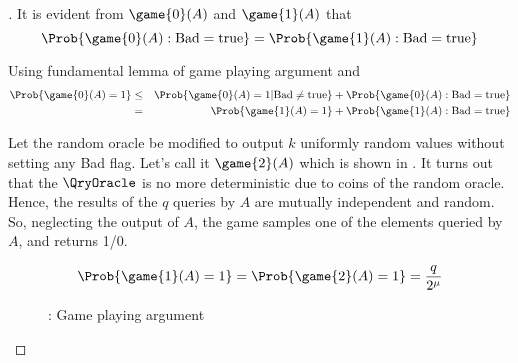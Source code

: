 \begin{proof}[]
\noindent
It is evident from $\game{0}(A)$ and $\game{1}(A)$ that 
\begin{equation}
\Prob{\game{0}(A) : \mathrm{Bad}=\mathrm{true}} = \Prob{\game{1}(A) : \mathrm{Bad}=\mathrm{true}}\label{eq:1T3}
\end{equation}

\noindent
Using fundamental lemma of game playing argument and 
\begin{eqnarray}
\nonumber \Prob{\game{0}(A)=1} & \leq & \Prob{\game{0}(A)=1 | \mathrm{Bad} \neq \mathrm{true}} + \Prob{\game{0}(A) : \mathrm{Bad}=\mathrm{true}}\\
&=& \Prob{\game{1}(A)=1} + \Prob{\game{1}(A) : \mathrm{Bad}=\mathrm{true}}\label{eq:2T3}
\end{eqnarray}

\noindent
Let the random oracle be modified to output $k$ uniformly random values without setting any Bad flag. Let's call it $\game{2}(A)$ which is shown in . It turns out that the  $\QryOracle$ is no more deterministic due to coins of the random oracle. Hence, the results of the $q$ queries by $A$ are mutually independent and random. So, neglecting the output of $A$, the game samples one of the elements queried by $A$, and returns 1/0. 

\begin{equation}
\Prob{\game{1}(A)=1} = \Prob{\game{2}(A)=1} = \frac{q}{2^\mu}\label{eq:3T3}
\end{equation}

\begin{figure}
\centering
{}
\caption{: Game playing argument}\label{fig:Game2T3}
\end{figure}


\end{proof}

